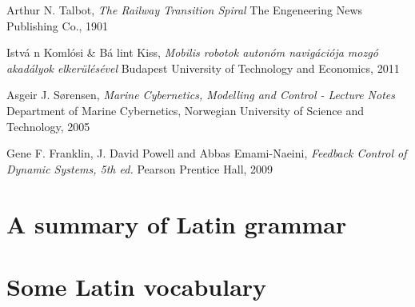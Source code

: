 \documentclass{ifacconf}
\begin{document}
%

\begin{thebibliography}{xx}

Arthur N. Talbot,
\newblock \emph{The Railway Transition Spiral}
\newblock The Engeneering News Publishing Co., 1901

Istv\'a n Koml\'{o}si \& B\'a lint Kiss, %
\newblock \emph{Mobilis robotok auton\'{o}m navig\'aci\'{o}ja mozg\'{o} akad\'alyok elker\"ul\'es\'evel} %
\newblock Budapest University of Technology and Economics, 2011 %

Asgeir J. S\o rensen,
\newblock \emph{Marine Cybernetics, Modelling and Control - Lecture Notes}
\newblock Department of Marine Cybernetics, Norwegian University of Science and Technology, 2005

Gene F. Franklin, J. David Powell and Abbas Emami-Naeini,
\newblock \emph{Feedback Control of Dynamic Systems, 5th ed.}
\newblock Pearson Prentice Hall, 2009

\end{thebibliography}








\appendix
\section{A summary of Latin grammar}    %
\section{Some Latin vocabulary}         %
\end{document}
